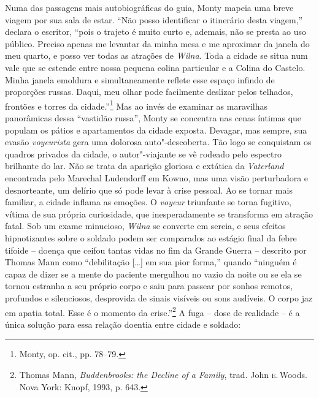 Numa das passagens mais autobiográficas do guia, Monty mapeia uma breve
viagem por sua sala de estar. ``Não posso identificar o itinerário desta
viagem,'' declara o escritor, ``pois o trajeto é muito curto e, ademais,
não se presta ao uso público. Preciso apenas me levantar da minha mesa e
me aproximar da janela do meu quarto, e posso ver todas as atrações de
\textit{Wilna}. Toda a cidade se situa num vale que se estende entre nossa
pequena colina particular e a Colina do Castelo. Minha janela emoldura e
simultaneamente reflete esse espaço infindo de proporções russas. Daqui,
meu olhar pode facilmente deslizar pelos telhados, frontões e torres da
cidade.''\footnote{Monty, op. cit., pp. 78--79.} Mas ao invés de examinar
as maravilhas panorâmicas dessa ``vastidão russa'', Monty se concentra
nas cenas íntimas que populam os pátios e apartamentos da cidade
exposta. Devagar, mas sempre, sua evasão \textit{voyeurista} gera uma dolorosa
auto"-descoberta. Tão logo se conquistam os quadros privados da cidade, o
autor"-viajante se vê rodeado pelo espectro brilhante do lar. Não se
trata da aparição gloriosa e extática da \textit{Vaterland} encontrada
pelo Marechal Ludendorff em Kowno, mas uma visão perturbadora e
desnorteante, um delírio que só pode levar à crise pessoal. Ao se tornar
mais familiar, a cidade inflama as emoções. O \textit{voyeur} triunfante se torna
fugitivo, vítima de sua própria curiosidade, que inesperadamente se
transforma em atração fatal. Sob um exame minucioso, \textit{Wilna} se converte
em sereia, e seus efeitos hipnotizantes sobre o soldado podem ser
comparados ao estágio final da febre tifoide -- doença que ceifou tantas
vidas no fim da Grande Guerra -- descrito por Thomas Mann como
``debilitação [\ldots{}] em sua pior forma,'' quando ``ninguém é capaz de
dizer se a mente do paciente mergulhou no vazio da noite ou se ela se
tornou estranha a seu próprio corpo e saiu para passear por sonhos
remotos, profundos e silenciosos, desprovida de sinais visíveis ou sons
audíveis. O corpo jaz em apatia total. Esse é o momento da
crise.''\footnote{Thomas Mann, \textit{Buddenbrooks: the Decline of a Family}, trad. John \textsc{e}.\,Woods. Nova York: Knopf, 1993, p. 643.} A fuga -- dose de realidade -- é a única solução para essa relação doentia entre
cidade e soldado:

